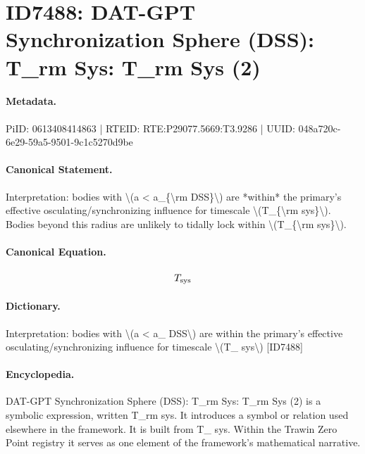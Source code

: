 \section*{ID7488: DAT-GPT Synchronization Sphere (DSS): T\_rm Sys: T\_rm Sys (2)}
\paragraph{Metadata.}
PiID: 0613408414863 | RTEID: RTE:P29077.5669:T3.9286 | UUID: 048a720c-6e29-59a5-9501-9c1c5270d9be

\paragraph{Canonical Statement.}
Interpretation: bodies with \textbackslash{}(a < a\_\{\textbackslash{}rm DSS\}\textbackslash{}) are *within* the primary’s effective osculating/synchronizing influence for timescale \textbackslash{}(T\_\{\textbackslash{}rm sys\}\textbackslash{}). Bodies beyond this radius are unlikely to tidally lock within \textbackslash{}(T\_\{\textbackslash{}rm sys\}\textbackslash{}).

\paragraph{Canonical Equation.}
\[
T_{\rm sys}
\]

\paragraph{Dictionary.}
Interpretation: bodies with \textbackslash{}(a < a\_ DSS\textbackslash{}) are within the primary’s effective osculating/synchronizing influence for timescale \textbackslash{}(T\_ sys\textbackslash{}) [ID7488]

\paragraph{Encyclopedia.}
DAT-GPT Synchronization Sphere (DSS): T\_rm Sys: T\_rm Sys (2) is a symbolic expression, written T\_rm sys. It introduces a symbol or relation used elsewhere in the framework. It is built from T\_ sys. Within the Trawin Zero Point registry it serves as one element of the framework's mathematical narrative.
